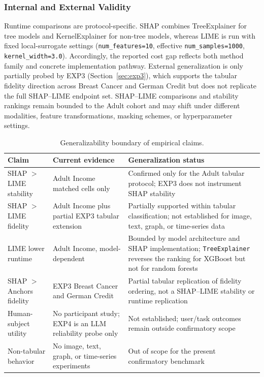 \documentclass[10pt,a4paper,twoside]{article}
\begin{document}
\subsubsection{Internal and External Validity}

Runtime comparisons are protocol-specific. SHAP combines TreeExplainer
for tree models and KernelExplainer for non-tree models, whereas LIME is
run with fixed local-surrogate settings (\texttt{num\_features=10},
effective \texttt{num\_samples=1000}, \texttt{kernel\_width=3.0}).
Accordingly, the reported cost gap reflects both method family and
concrete implementation pathway. External generalization is only partially
probed by EXP3 (Section~\ref{sec:exp3}), which supports the tabular
fidelity direction across Breast Cancer and German Credit but does not
replicate the full SHAP--LIME endpoint set. SHAP--LIME comparisons and
stability rankings remain bounded to the Adult cohort and may shift under
different modalities, feature transformations, masking schemes, or
hyperparameter settings.

\begin{table}[t]
\centering
\caption{Generalizability boundary of empirical claims.}
\label{tab:generalizability_boundary}
\begin{tabularx}{\linewidth}{l X X}
\toprule
\textbf{Claim} & \textbf{Current evidence} & \textbf{Generalization status} \\
\midrule
SHAP $>$ LIME stability & Adult Income matched cells only & Confirmed only for the Adult tabular protocol; EXP3 does not instrument SHAP stability \\
SHAP $>$ LIME fidelity & Adult Income plus partial EXP3 tabular extension & Partially supported within tabular classification; not established for image, text, graph, or time-series data \\
LIME lower runtime & Adult Income, model-dependent & Bounded by model architecture and SHAP implementation; \texttt{TreeExplainer} reverses the ranking for XGBoost but not for random forests \\
SHAP $>$ Anchors fidelity & EXP3 Breast Cancer and German Credit & Partial tabular replication of fidelity ordering, not a SHAP--LIME stability or runtime replication \\
Human-subject utility & No participant study; EXP4 is an LLM reliability probe only & Not established; user/task outcomes remain outside confirmatory scope \\
Non-tabular behavior & No image, text, graph, or time-series experiments & Out of scope for the present confirmatory benchmark \\
\bottomrule
\end{tabularx}
\end{table}
\end{document}
